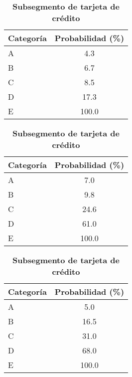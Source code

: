 \begin{table}[H]
\centering
\begin{subtable}[t]{0.32\textwidth}
\centering
\begin{tabular}{@{}lc@{}}
\toprule
\textbf{Categoría} & \textbf{Probabilidad (\%)} \\
\midrule
A & 4.3 \\
B & 6.7 \\
C & 8.5 \\
D & 17.3 \\
E & 100.0 \\
\bottomrule
\end{tabular}
\caption{\textbf{Subsegmento de hipotecarios para vivienda}}
\end{subtable}
\hfill
\begin{subtable}[t]{0.32\textwidth}
\centering
\begin{tabular}{@{}lc@{}}
\toprule
\textbf{Categoría} & \textbf{Probabilidad (\%)} \\
\midrule
A & 7.0 \\
B & 9.8 \\
C & 24.6 \\
D & 61.0 \\
E & 100.0 \\
\bottomrule
\end{tabular}
\caption{\textbf{Subsegmento de cédulas hipotecarias}}
\end{subtable}
\hfill
\begin{subtable}[t]{0.32\textwidth}
\centering
\begin{tabular}{@{}lc@{}}
\toprule
\textbf{Categoría} & \textbf{Probabilidad (\%)} \\
\midrule
A & 5.0 \\
B & 16.5 \\
C & 31.0 \\
D & 68.0 \\
E & 100.0 \\
\bottomrule
\end{tabular}
\caption{\textbf{Subsegmento de tarjeta de crédito}}
\end{subtable}


\end{table}
